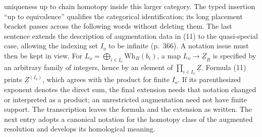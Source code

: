 \documentclass[10pt,oneside]{book}
\begin{document}
uniqueness up to chain homotopy inside this larger category. The typed insertion ``up to equivalence'' qualifies the categorical identification; its long placement bracket passes across the following words without deleting them. The last sentence extends the description of augmentation data in (11) to the quasi-special case, allowing the indexing set $I_o$ to be infinite (p.~366). A notation issue must then be kept in view. For $L_o=\bigoplus_{i\in I_o}\mathrm{Wh}_B(b_i)$, a map $L_o\to\underline Z_B$ is specified by an arbitrary family of integers, hence by an element of $\prod_{i\in I_o}\underline Z$. Formula (11) prints $\underline Z^{(I_o)}$, which agrees with the product for finite $I_o$. If its parenthesized exponent denotes the direct sum, the final extension needs that notation changed or interpreted as a product; an unrestricted augmentation need not have finite support. The transcription leaves the formula and the extension as written. The next entry adopts a canonical notation for the homotopy class of the augmented resolution and develops its homological meaning.
\end{document}
